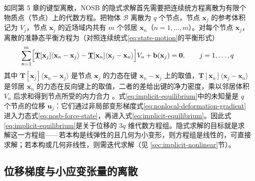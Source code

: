 如同第 5 章的键型离散，NOSB 的隐式求解首先需要把连续统方程离散为有限个物质点（节点）上的代数方程。把物体 $\mathcal{B}$ 离散为 $q$ 个节点，节点 $\mathbf{x}_j$ 的参考体积记为 $V_j$，节点 $\mathbf{x}_j$ 的近场域内共有 $m$ 个邻居 $\mathbf{x}_n$（$n=1,\ldots,m$）。对每个节点 $\mathbf{x}_j$，离散的准静态平衡方程为（对照连续统式\eqref{eq:state-motion}的平衡形式）
\begin{equation}
  \sum_{n=1}^{m}\Bigl[
    \underline{\mathbf{T}}[\mathbf{x}_j]\langle\mathbf{x}_n-\mathbf{x}_j\rangle
    -\underline{\mathbf{T}}[\mathbf{x}_n]\langle\mathbf{x}_j-\mathbf{x}_n\rangle
  \Bigr]V_n+\mathbf{b}(\mathbf{x}_j)=\mathbf{0},\qquad j=1,\ldots,q
  \label{eq:implicit-equilibrium}
\end{equation}
其中 $\underline{\mathbf{T}}[\mathbf{x}_j]\langle\mathbf{x}_n-\mathbf{x}_j\rangle$ 是节点 $\mathbf{x}_j$ 的力态在键 $\mathbf{x}_n-\mathbf{x}_j$ 上的取值，$\underline{\mathbf{T}}[\mathbf{x}_n]\langle\mathbf{x}_j-\mathbf{x}_n\rangle$ 是邻居 $\mathbf{x}_n$ 的力态在反向键上的取值，二者的差给出键的净力密度，乘以邻居体积 $V_n$ 后求和得到节点所受的内力合力 \cite{Breitenfeld2014}。式\eqref{eq:implicit-equilibrium}中的未知量是 $q$ 个节点的位移 $\mathbf{u}_j$：它们通过非局部变形梯度式\eqref{eq:nonlocal-deformation-gradient}进入力态式\eqref{eq:nosb-force-state}，再进入式\eqref{eq:implicit-equilibrium}。因此式\eqref{eq:implicit-equilibrium}是关于位移的 $3q$ 维代数方程组。隐式求解的目标就是求解这一方程组——若本构是线弹性的且几何为小变形，则方程组是线性的，可直接求解；若本构或几何非线性，则需迭代求解（见 \ref{sec:implicit-nonlinear}节）。

\subsection{位移梯度与小应变张量的离散}\label{sec:implicit-strain}

